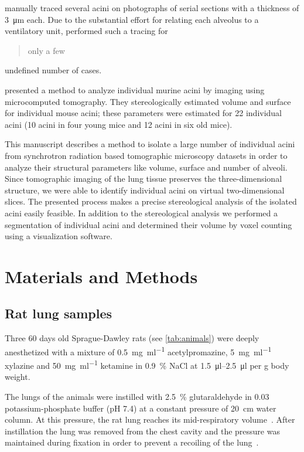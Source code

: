 \documentclass[a4paper,DIV=calc,abstract,english]{scrartcl}
\begin{document}
\citet{Mercer1987a} manually traced several acini on photographs of serial sections with a thickness of \SI{3}{\micro\meter} each.
Due to the substantial effort for relating each alveolus to a ventilatory unit, \citeauthor{Mercer1987a} performed such a tracing for \blockquote{only a few} undefined number of cases.

\citet{Vasilescu2012} presented a method to analyze individual murine acini by imaging using microcomputed tomography.
They stereologically estimated volume and surface for individual mouse acini; these parameters were estimated for 22 individual acini (10 acini in four young mice and 12 acini in six old mice).

This manuscript describes a method to isolate a large number of individual acini from synchrotron radiation based tomographic microscopy datasets in order to analyze their structural parameters like volume, surface and number of alveoli.
Since tomographic imaging of the lung tissue preserves the three-dimensional structure, we were able to identify individual acini on virtual two-dimensional slices.
The presented process makes a precise stereological analysis of the isolated acini easily feasible.
In addition to the stereological analysis we performed a segmentation of individual acini and determined their volume by voxel counting using a visualization software.

\section{Materials and Methods}
\label{sec:materials and methods}
\subsection{Rat lung samples}
Three 60 days old Sprague-Dawley rats (see \autoref{tab:animals}) were deeply anesthetized with a mixture of %
\SI[per-mode=fraction]{0.5}{\milli\gram\per\milli\litre} acetylpromazine, %
\SI[per-mode=fraction]{5}{\milli\gram\per\milli\litre} xylazine and %
\SI[per-mode=fraction]{50}{\milli\gram\per\milli\litre} ketamine in %
\SI{0.9}{\percent} NaCl at \SIrange{1.5}{2.5}{\micro\litre} per \si{\gram} body weight.

The lungs of the animals were instilled with \SI{2.5}{\percent} glutaraldehyde in \SI{0.03}{\milli\Molar} potassium-phosphate buffer (pH 7.4) at a constant pressure of \SI{20}{\centi\meter} water column.
At this pressure, the rat lung reaches its mid-respiratory volume~\citep{Schittny1998}.
After instillation the lung was removed from the chest cavity and the pressure was maintained during fixation in order to prevent a recoiling of the lung~\citep{Mund2008}.
\end{document}

